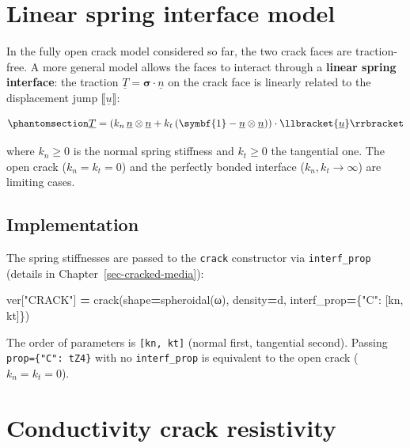 \documentclass[
  a4paper,
  numbers=noendperiod,
  DIV=12]{scrreprt}
\newenvironment{Shaded}{\begin{snugshade}}{\end{snugshade}}
\newcommand{\NormalTok}[1]{#1}
\newcommand{\OperatorTok}[1]{\textcolor[rgb]{0.81,0.36,0.00}{\textbf{#1}}}
\newcommand{\StringTok}[1]{\textcolor[rgb]{0.31,0.60,0.02}{#1}}
\newcommand{\uu}[1]{{\symbf{{#1}}}}
\newcommand{\uv}[1]{{\underline{{#1}}}}
\newcommand{\sig}{{\uu{{\sigma}}}}
\newcommand{\jump}[1]{\llbracket #1 \rrbracket}
\begin{document}
\section{Linear spring interface model}\label{sec-spring-model}

In the fully open crack model considered so far, the two crack faces are
traction-free. A more general model allows the faces to interact through
a \textbf{linear spring interface}: the traction
\(\uv{T}=\uu{\sig}\cdot\uv{n}\) on the crack face is linearly related to
the displacement jump \(\jump{\uv{u}}\):

\begin{equation}\protect\phantomsection\label{eq-spring-law}{
\uv{T} = \left(k_n\,\uv{n}\otimes\uv{n} + k_t\,(\uu{1}-\uv{n}\otimes\uv{n})\right)\cdot\jump{\uv{u}}
}\end{equation}

where \(k_n \geq 0\) is the normal spring stiffness and \(k_t \geq 0\)
the tangential one. The open crack (\(k_n=k_t=0\)) and the perfectly
bonded interface (\(k_n,k_t\to\infty\)) are limiting cases.

\subsection{Implementation}\label{implementation}

The spring stiffnesses are passed to the \texttt{crack} constructor via
\texttt{interf\_prop} (details in Chapter~\ref{sec-cracked-media}):

\begin{Shaded}
\begin{Highlighting}[]
\NormalTok{ver[}\StringTok{"CRACK"}\NormalTok{] }\OperatorTok{=}\NormalTok{ crack(shape}\OperatorTok{=}\NormalTok{spheroidal(ω), density}\OperatorTok{=}\NormalTok{d,}
\NormalTok{                     interf\_prop}\OperatorTok{=}\NormalTok{\{}\StringTok{"C"}\NormalTok{: [kn, kt]\})}
\end{Highlighting}
\end{Shaded}

The order of parameters is \texttt{{[}kn,\ kt{]}} (normal first,
tangential second). Passing \texttt{prop=\{"C":\ tZ4\}} with no
\texttt{interf\_prop} is equivalent to the open crack (\(k_n=k_t=0\)).

\section{Conductivity crack resistivity}\label{sec-crack-conduc}
\end{document}
